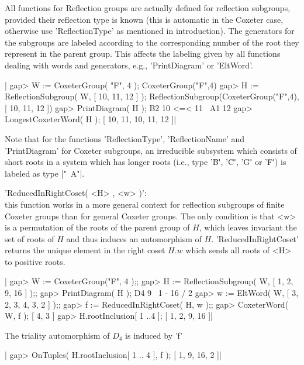 
All functions for Reflection groups  are actually defined for reflection
subgroups, provided their reflection type is known (this is automatic in
the  Coxeter  case,  otherwise  use  'ReflectionType'  as  mentioned  in
introduction). The generators for the subgroups are labeled according to
the corresponding number of the root they represent in the parent group.
This affects the labeling given by  all functions dealing with words and
generators, e.g., 'PrintDiagram' or 'EltWord'.

|    gap> W := CoxeterGroup( "F", 4 );
    CoxeterGroup("F",4)
    gap> H := ReflectionSubgroup( W, [ 10, 11, 12 ] );
    ReflectionSubgroup(CoxeterGroup("F",4), [ 10, 11, 12 ])
    gap> PrintDiagram( H );
    B2 10 <=< 11
    ~A1 12
    gap> LongestCoxeterWord( H );
    [ 10, 11, 10, 11, 12 ]|

Note  that  for  the functions  'ReflectionType',  'ReflectionName'  and
'PrintDiagram'  for Coxeter  subgroups, an  irreducible subsystem  which
consists of short  roots in a system which has  longer roots (i.e., type
'\"B\"', '\"C\"', '\"G\"' or '\"F\"') is labeled as type |"~A"|.

'ReducedInRightCoset(  <H> ,  <w> )':\\  this function  works in  a more
general context for  reflection subgroups of finite  Coxeter groups than
for  general  Coxeter groups.  The  only  condition  is  that <w>  is  a
permutation  of the  roots  of the  parent group  of  $H$, which  leaves
invariant the  set of roots of  $H$ and thus induces  an automorphism of
$H$. 'ReducedInRightCoset' returns the unique element in the right coset
$H.w$ which sends all roots of <H> to positive roots.

|    gap> W := CoxeterGroup("F", 4 );;
    gap> H := ReflectionSubgroup( W, [ 1, 2, 9, 16 ] );;
    gap> PrintDiagram( H );
    D4 9
        \
         1 - 16
        /
       2
    gap> w := EltWord( W, [ 3, 2, 3, 4, 3, 2 ] );;
    gap> f := ReducedInRightCoset( H, w );;
    gap> CoxeterWord( W, f );
    [ 4, 3 ]
    gap> H.rootInclusion{[ 1 ..4 ]};
    [ 1, 2, 9, 16 ]|

The triality automorphism of $D_4$ is induced by 'f'\:

|    gap> OnTuples( H.rootInclusion{[ 1 .. 4 ]}, f );
    [ 1, 9, 16, 2 ]|

\Section{ReducedRightCosetRepresentatives}

